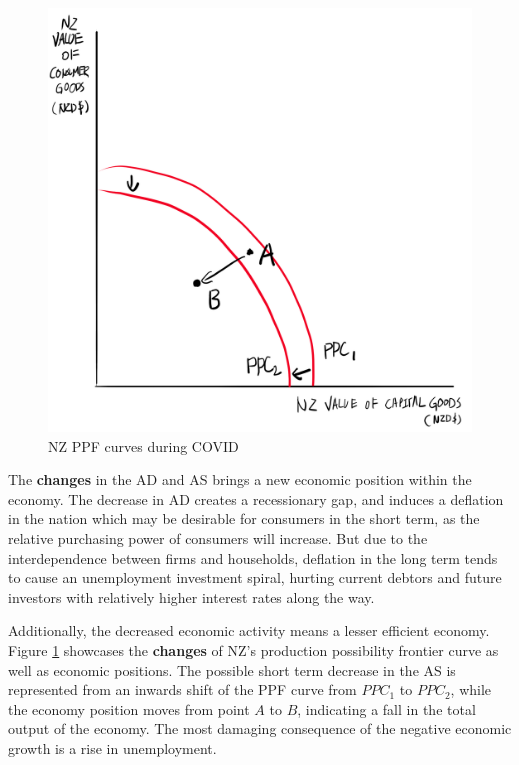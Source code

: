 \documentclass[a4paper,12pt]{article}
\begin{document}
\begin{figure}[H]
    \centering
    \includegraphics[scale=0.6]{assets/ppf.png}
    \caption{NZ PPF curves during COVID}
    \label{fig:ppf}
\end{figure}

The \textbf{changes} in the AD and AS brings a new economic position within the economy. The decrease in AD creates a recessionary gap, and induces a deflation in the nation which may be desirable for consumers in the short term, as the relative purchasing power of consumers will increase. But due to the interdependence between firms and households, deflation in the long term tends to cause an unemployment investment spiral,
hurting current debtors and future investors with relatively higher interest rates along the way.

Additionally, the decreased economic activity means a lesser efficient economy. Figure \ref{fig:ppf} showcases the \textbf{changes} of NZ's production possibility frontier curve as well as economic positions. The possible short term decrease in the AS is represented from an inwards shift of the PPF curve from $PPC_1$ to $PPC_2$, while the economy position moves from point $A$ to $B$, indicating a fall in the total output of the economy. The most damaging consequence of the negative economic growth is a rise in unemployment.
\end{document}
